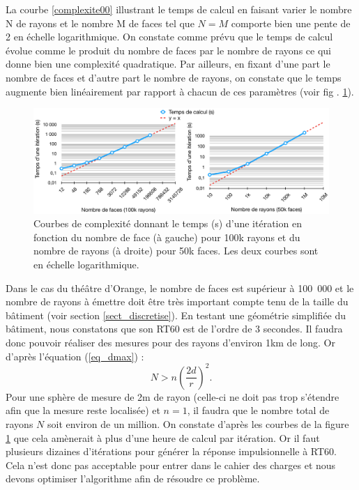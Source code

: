 La courbe \ref{complexite00} illustrant le temps de calcul en faisant varier le nombre N de rayons et le nombre M de faces tel que $N=M$ comporte bien une pente de 2 en échelle logarithmique. On constate comme prévu que le temps de calcul évolue comme le produit du nombre de faces par le nombre de rayons ce qui donne bien une complexité quadratique. Par ailleurs, en fixant d'une part le nombre de faces et d'autre part le nombre de rayons, on constate que le temps augmente bien linéairement par rapport à chacun de ces paramètres (voir fig . \ref{complexite0}).

 \begin{figure}[t]
	\includegraphics[width=\linewidth]{images/complexite0}
	\caption{Courbes de complexité donnant le temps (s) d'une itération en fonction du nombre de face (à gauche) pour 100k rayons et du nombre de rayons (à droite) pour 50k faces. Les deux courbes sont en échelle logarithmique.}
	\label{complexite0}
\end{figure}


Dans le cas du théâtre d'Orange, le nombre de faces est supérieur à 100~000 et le nombre de rayons à émettre doit être très important compte tenu de la taille du bâtiment (voir section \ref{sect_discretise}). En testant une géométrie simplifiée du bâtiment, nous constatons que son \gls{RT60} est de l'ordre de 3 secondes. Il faudra donc pouvoir réaliser des mesures pour des rayons d'environ 1km de long. Or d'après l'équation (\ref{eq_dmax}) :
%
\begin{equation}
N > n\left(\frac{2d}{r}\right)^2.
\end{equation}
%
Pour une sphère de mesure de 2m de rayon (celle-ci ne doit pas trop s'étendre afin que la mesure reste localisée) et $n=1$, il faudra que le nombre total de rayons $N$ soit environ de un million. On constate d'après les courbes de la figure \ref{complexite0} que cela amènerait à plus d'une heure de calcul par itération. Or il faut plusieurs dizaines d'itérations pour générer la réponse impulsionnelle à \gls{RT60}. Cela n'est donc pas acceptable pour entrer dans le cahier des charges et nous devons optimiser l'algorithme afin de résoudre ce problème.

